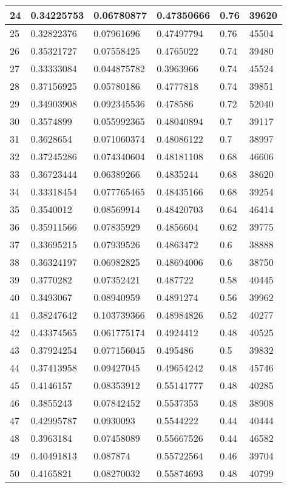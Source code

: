 \begin{longtable}{|l|l|l|l|l|l|}
24 & 0.34225753 & 0.06780877 & 0.47350666 & 0.76 & 39620 \\ \hline 
25 & 0.32822376 & 0.07961696 & 0.47497794 & 0.76 & 45504 \\ \hline 
26 & 0.35321727 & 0.07558425 & 0.4765022 & 0.74 & 39480 \\ \hline 
27 & 0.33333084 & 0.044875782 & 0.3963966 & 0.74 & 45524 \\ \hline 
28 & 0.37156925 & 0.05780186 & 0.4777818 & 0.74 & 39851 \\ \hline 
29 & 0.34903908 & 0.092345536 & 0.478586 & 0.72 & 52040 \\ \hline 
30 & 0.3574899 & 0.055992365 & 0.48040894 & 0.7 & 39117 \\ \hline 
31 & 0.3628654 & 0.071060374 & 0.48086122 & 0.7 & 38997 \\ \hline 
32 & 0.37245286 & 0.074340604 & 0.48181108 & 0.68 & 46606 \\ \hline 
33 & 0.36723444 & 0.06389266 & 0.4835244 & 0.68 & 38620 \\ \hline 
34 & 0.33318454 & 0.077765465 & 0.48435166 & 0.68 & 39254 \\ \hline 
35 & 0.3540012 & 0.08569914 & 0.48420703 & 0.64 & 46414 \\ \hline 
36 & 0.35911566 & 0.07835929 & 0.4856604 & 0.62 & 39775 \\ \hline 
37 & 0.33695215 & 0.07939526 & 0.4863472 & 0.6 & 38888 \\ \hline 
38 & 0.36324197 & 0.06982825 & 0.48694006 & 0.6 & 38750 \\ \hline 
39 & 0.3770282 & 0.07352421 & 0.487722 & 0.58 & 40445 \\ \hline 
40 & 0.3493067 & 0.08940959 & 0.4891274 & 0.56 & 39962 \\ \hline 
41 & 0.38247642 & 0.103739366 & 0.48984826 & 0.52 & 40277 \\ \hline 
42 & 0.43374565 & 0.061775174 & 0.4924412 & 0.48 & 40525 \\ \hline 
43 & 0.37924254 & 0.077156045 & 0.495486 & 0.5 & 39832 \\ \hline 
44 & 0.37413958 & 0.09427045 & 0.49654242 & 0.48 & 45746 \\ \hline 
45 & 0.4146157 & 0.08353912 & 0.55141777 & 0.48 & 40285 \\ \hline 
46 & 0.3855243 & 0.07842452 & 0.5537353 & 0.48 & 38908 \\ \hline 
47 & 0.42995787 & 0.0930093 & 0.5544222 & 0.44 & 40444 \\ \hline 
48 & 0.3963184 & 0.07458089 & 0.55667526 & 0.44 & 46582 \\ \hline 
49 & 0.40491813 & 0.087874 & 0.55722564 & 0.46 & 39704 \\ \hline 
50 & 0.4165821 & 0.08270032 & 0.55874693 & 0.48 & 40799 \\ \hline 
\end{longtable}